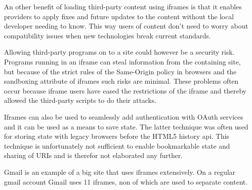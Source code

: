 \documentclass[english]{ifimaster}
\begin{document}
An other benefit of loading third-party content using iframes is that it enables providers to apply fixes and future updates to the content without the local developer needing to know. This way users of content don't need to worry about compatibility issues when new technologies break current standards.

Allowing third-party programs on to a site could however be a security risk. Programs running in an iframe can steal information from the containing site, but because of the strict rules of the Same-Origin policy in browsers and the sandboxing attribute of iframes such risks are minimal. These problems often occur because iframe users have eased the restrictions of the iframe and thereby allowed the third-party scripts to do their attacks. 

Iframes can also be used to seamlessly add authentication with OAuth services and it can be used as a means to save state. The latter technique was often used for storing state with legacy browsers before the HTML5 history api. This technique is unfortunately not sufficient to enable bookmarkable state and sharing of URIs and is therefor not elaborated any further. 

Gmail is an example of a big site that uses iframes extensively. On a regular gmail account Gmail uses 11 iframes, non of which are used to separate content.




\end{document}
